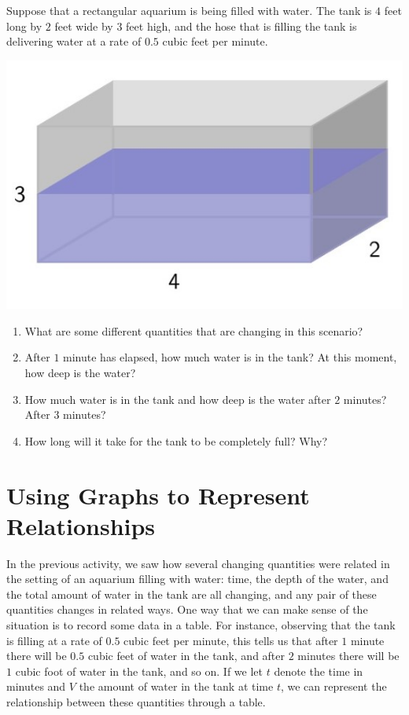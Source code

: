 \documentclass{ximera}
\begin{document}
\begin{exploration}
Suppose that a rectangular aquarium is being filled with water.  The tank is \(4\) feet long by \(2\) feet wide by \(3\) feet high, and the hose that is filling the tank is delivering water at a rate of \(0.5\) cubic feet per minute.

\begin{image}
\includegraphics{CiTtext2.jpg}
\end{image}

\begin{enumerate}[label=\alph*.]
\item What are some different quantities that are changing in this scenario?%
\item After \(1\) minute has elapsed, how much water is in the tank?  At this moment, how deep is the water?%
\item How much water is in the tank and how deep is the water after \(2\) minutes?  After \(3\) minutes?%
\item How long will it take for the tank to be completely full?  Why?%
\end{enumerate}
\end{exploration}



\section{Using Graphs to Represent Relationships}
In the previous activity, we saw how several changing quantities were related in the setting of an aquarium filling with water: time, the depth of the water, and the total amount of water in the tank are all changing, and any pair of these quantities changes in related ways.  One way that we can make sense of the situation is to record some data in a table.  For instance, observing that the tank is filling at a rate of \(0.5\) cubic feet per minute, this tells us that after \(1\) minute there will be \(0.5\) cubic feet of water in the tank, and after \(2\) minutes there will be \(1\) cubic foot of water in the tank, and so on.  If we let \(t\) denote the time in minutes and \(V\) the amount of water in the tank at time \(t\), we can represent the relationship between these quantities through a table.%
\end{document}
